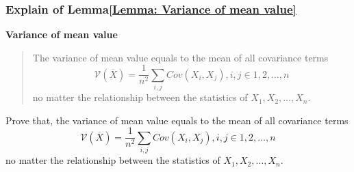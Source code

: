 \documentclass[../concepts.tex]{subfiles}
\begin{document}
\subsubsection{Explain of Lemma\ref{Lemma: Variance of mean value}}
\textbf{Variance of mean value}
\begin{quote}
    The variance of mean value equals to the mean of all covariance terms
    \begin{equation*}
        \mathcal{V}(\overline{X}) =
        \frac{1}{n^2} \sum_{i, j} Cov(X_i, X_j),
        i, j \in 1, 2, \dots, n
    \end{equation*}
    no matter the relationship between the statistics of $X_1, X_2, \dots, X_n$.
\end{quote}

Prove that, the variance of mean value equals to the mean of all covariance terms
\begin{equation*}
    \mathcal{V}(\overline{X}) =
    \frac{1}{n^2} \sum_{i, j} Cov(X_i, X_j),
    i, j \in 1, 2, \dots, n
\end{equation*}
no matter the relationship between the statistics of $X_1, X_2, \dots, X_n$.
\end{document}
